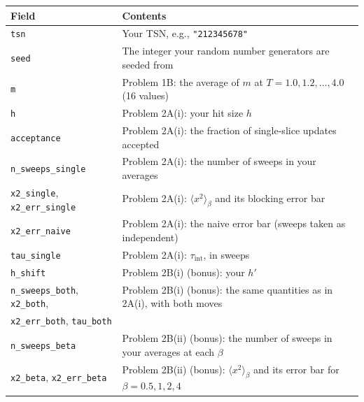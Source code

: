 \begin{center}
  \begin{tabular}{@{}lp{}@{}}
    \toprule
    Field                                            & Contents                                                                                        \\
    \midrule
    \texttt{tsn}                                     & Your TSN, e.g., \texttt{"212345678"}                                                            \\
    \texttt{seed}                                    & The integer your random number generators are seeded from                                      \\
    \texttt{m}                                       & Problem 1B: the average of $m$ at $T = 1.0, 1.2, \ldots, 4.0$ (16 values)                       \\
    \texttt{h}                                       & Problem 2A(i): your hit size $h$                                                                \\
    \texttt{acceptance}                              & Problem 2A(i): the fraction of single-slice updates accepted                                    \\
    \texttt{n\_sweeps\_single}                       & Problem 2A(i): the number of sweeps in your averages                                            \\
    \texttt{x2\_single}, \texttt{x2\_err\_single}    & Problem 2A(i): $\langle x^2\rangle_\beta$ and its blocking error bar                            \\
    \texttt{x2\_err\_naive}                          & Problem 2A(i): the naive error bar (sweeps taken as independent)                                \\
    \texttt{tau\_single}                             & Problem 2A(i): $\tau_\mathrm{int}$, in sweeps                                                   \\
    \texttt{h\_shift}                                & Problem 2B(i) (bonus): your $h'$                                                                \\
    \texttt{n\_sweeps\_both}, \texttt{x2\_both},     & Problem 2B(i) (bonus): the same quantities as in 2A(i), with both moves                         \\
    \quad\texttt{x2\_err\_both}, \texttt{tau\_both}  &                                                                                                 \\
    \texttt{n\_sweeps\_beta}                         & Problem 2B(ii) (bonus): the number of sweeps in your averages at each $\beta$                   \\
    \texttt{x2\_beta}, \texttt{x2\_err\_beta}        & Problem 2B(ii) (bonus): $\langle x^2\rangle_\beta$ and its error bar for $\beta = 0.5, 1, 2, 4$ \\
    \bottomrule
  \end{tabular}
\end{center}

